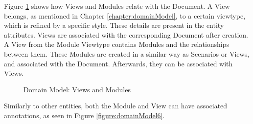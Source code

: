 Figure \ref{figure:domainModel5} shows how Views and Modules relate with the Document. A View belongs, as mentioned in Chapter \ref{chapter:domainModel}, to a certain viewtype, which is refined by a specific style. These details are present in the entity attributes. Views are associated with the corresponding Document after creation.
A View from the Module Viewtype contains Modules and the relationships between them. 
These Modules are created in a similar way as Scenarios or Views, and associated with the Document. Afterwards, they can be associated with Views.

\begin{figure}
\centering
\renewcommand {\umltextcolor}{black}
\renewcommand {\umlfillcolor}{none}
\renewcommand {\umldrawcolor}{black}

\caption{Domain Model: Views and Modules}
\label{figure:domainModel5}
\end{figure}

Similarly to other entities, both the Module and View can have associated annotations, as seen in Figure \ref{figure:domainModel6}.

